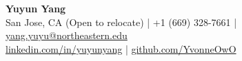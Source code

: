 \begin{center}
    {\LARGE \textbf{Yuyun Yang}} \\[2pt]

    \small
    San Jose, CA (Open to relocate)
    \;|\;
    +1 (669) 328-7661
    \;|\;
    \href{mailto:yang.yuyu@northeastern.edu}{yang.yuyu@northeastern.edu}
    \\[-1pt]

    \href{https://linkedin.com/in/yuyunyang}{linkedin.com/in/yuyunyang}
    \;|\;
    \href{https://github.com/YvonneOwO}{github.com/YvonneOwO}
\end{center}

\vspace{-9pt}